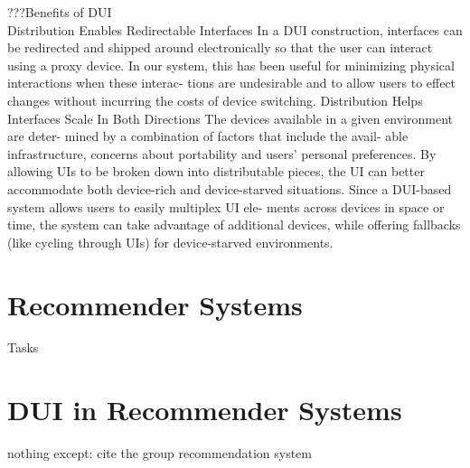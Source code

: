 ???Benefits of DUI \cite{chen2011distributed}\\
Distribution Enables Redirectable Interfaces
In a DUI construction, interfaces can be redirected and shipped around electronically so that the user can interact using a proxy device. In our system, this has been useful for minimizing physical interactions when these interac- tions are undesirable and to allow users to effect changes without incurring the costs of device switching.
Distribution Helps Interfaces Scale In Both Directions
The devices available in a given environment are deter- mined by a combination
of factors that include the avail- able infrastructure, concerns about
portability and users' personal preferences. By allowing UIs to be broken down into distributable pieces, the UI can better accommodate both device-rich and device-starved situations. Since a DUI-based system allows users to easily multiplex UI ele- ments across devices in space or time, the system can take advantage of additional devices, while offering fallbacks (like cycling through UIs) for device-starved environments.\\


\section{Recommender Systems}
Tasks

\section{DUI in Recommender Systems}
nothing except: cite the group recommendation system
